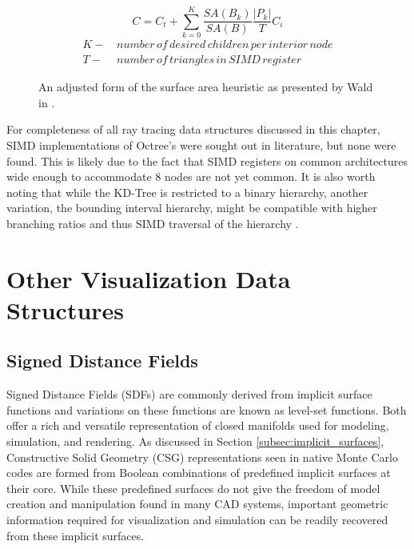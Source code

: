 \setcounter{footnote}{1}

\begin{figure}[H]
  \begin{equation}
    C = C_t + \sum_{k=0}^{K} \frac{SA(B_k)}{SA(B)}\frac{|P_k|}{T}C_i
  \end{equation}
  \begin{align*}
    K - & \, number \, of \, desired \, children \, per \, interior \, node \\
    T - & \, number \, of \, triangles \, in \, SIMD \, register
  \end{align*}
  \caption[Form of the surface area heuristic for an n-ary tree.]{An adjusted form of the surface area heuristic as presented by Wald
    in \cite{Wald_2008}. \protect\footnotemark}
  \label{adjusted_SAH}
\end{figure}


For completeness of all ray tracing data structures discussed in this chapter,
SIMD implementations of Octree's were sought out in literature, but none were
found. This is likely due to the fact that SIMD registers on common
architectures wide enough to accommodate 8 nodes are not yet common. It is also
worth noting that while the KD-Tree is restricted to a binary hierarchy, another
variation, the bounding interval hierarchy, might be compatible with higher
branching ratios and thus SIMD traversal of the hierarchy \cite{Watcher_2006}.

\section{Other Visualization Data Structures}

\subsection{Signed Distance Fields}

Signed Distance Fields (SDFs) are commonly derived from implicit surface
functions and variations on these functions are known as level-set
functions. Both offer a rich and versatile representation of closed manifolds
used for modeling, simulation, and rendering. As discussed in Section
\ref{subsec:implicit_surfaces}, Constructive Solid Geometry (CSG)
representations seen in native Monte Carlo codes are formed from Boolean
combinations of predefined implicit surfaces at their core. While these
predefined surfaces do not give the freedom of model creation and manipulation
found in many CAD systems, important geometric information required for
visualization and simulation can be readily recovered from these implicit
surfaces.

